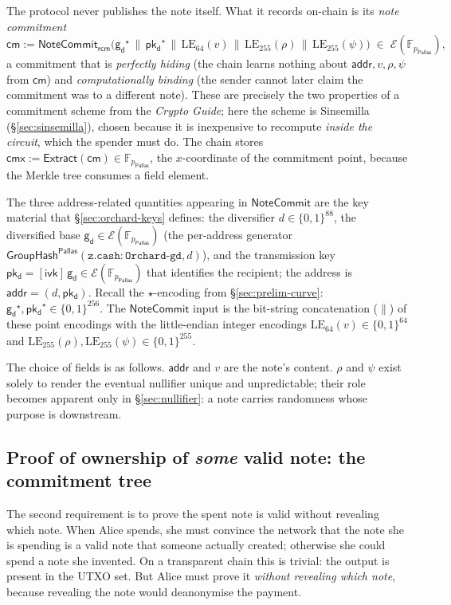 \documentclass[11pt,a4paper]{article}
\theoremstyle{definition}
\newcommand{\F}{\mathbb{F}}
\newcommand{\cmsym}{\mathsf{cm}}
\newcommand{\cmx}{\mathsf{cmx}}
\newcommand{\Pallas}{\ensuremath{\mathsf{Pallas}}}
\newcommand{\Ep}{\ensuremath{\mathcal{E}}}
\newcommand{\NoteCommit}{\ensuremath{\mathsf{NoteCommit}}}
\newcommand{\Extract}{\ensuremath{\mathsf{Extract}}}
\newcommand{\GroupHash}{\ensuremath{\mathsf{GroupHash}}}
\newcommand{\ivk}{\ensuremath{\mathsf{ivk}}}
\newcommand{\pkd}{\ensuremath{\mathsf{pk_d}}}
\newcommand{\gd}{\ensuremath{\mathsf{g_d}}}
\newcommand{\rcm}{\ensuremath{\mathsf{rcm}}}
\begin{document}
The protocol never publishes the note itself. What it records on-chain is its
\emph{note commitment}
\[
\cmsym := \NoteCommit_{\rcm}\bigl(\gd^\star \,\|\, \pkd^\star \,\|\, \mathrm{LE}_{64}(v) \,\|\, \mathrm{LE}_{255}(\rho) \,\|\, \mathrm{LE}_{255}(\psi)\bigr) \;\in\; \Ep(\F_{p_{\Pallas}}),
\]
a commitment that is \emph{perfectly hiding} (the chain learns nothing
about $\mathsf{addr}, v, \rho, \psi$ from $\cmsym$) and
\emph{computationally binding} (the sender cannot later claim the
commitment was to a different note). These are precisely the two properties
of a commitment scheme from the \emph{Crypto Guide}; here the scheme is
Sinsemilla (\S\ref{sec:sinsemilla}), chosen because it is inexpensive to
recompute \emph{inside the circuit}, which the spender must do. The chain
stores $\cmx := \Extract(\cmsym) \in \F_{p_{\Pallas}}$, the
$x$-coordinate of the commitment point, because the Merkle tree consumes a field element.

The three address-related quantities appearing in $\NoteCommit$ are the
key material that \S\ref{sec:orchard-keys} defines: the diversifier
$d \in \{0,1\}^{88}$, the diversified base
$\gd \in \Ep(\F_{p_{\Pallas}})$ (the per-address generator
$\GroupHash^{\Pallas}(\mathtt{z.cash:Orchard\text{-}gd}, d)$), and the
transmission key $\pkd = [\ivk]\,\gd \in \Ep(\F_{p_{\Pallas}})$ that
identifies the recipient; the address is $\mathsf{addr} = (d, \pkd)$.
Recall the $\star$-encoding from \S\ref{sec:prelim-curve}: $\gd^\star,
\pkd^\star \in \{0,1\}^{256}$. The $\NoteCommit$ input is the bit-string
concatenation ($\|$) of these point encodings with the little-endian
integer encodings $\mathrm{LE}_{64}(v) \in \{0,1\}^{64}$ and
$\mathrm{LE}_{255}(\rho), \mathrm{LE}_{255}(\psi) \in \{0,1\}^{255}$.

The choice of fields is as follows. $\mathsf{addr}$ and $v$ are the note's
content. $\rho$ and $\psi$ exist solely to render the eventual nullifier
unique and unpredictable; their role becomes apparent only in
\S\ref{sec:nullifier}: a note carries
randomness whose purpose is downstream.

\subsection{Proof of ownership of \emph{some} valid note: the commitment tree}\label{sec:tree}

The second requirement is to prove the spent note is valid without revealing
which note. When Alice spends, she must convince the network that
the note she is spending is a valid note that someone actually created;
otherwise she could spend a note she invented. On a transparent chain this
is trivial: the output is present in the UTXO set. But Alice must prove
it \emph{without revealing which note}, because revealing the note would
deanonymise the payment.
\end{document}
